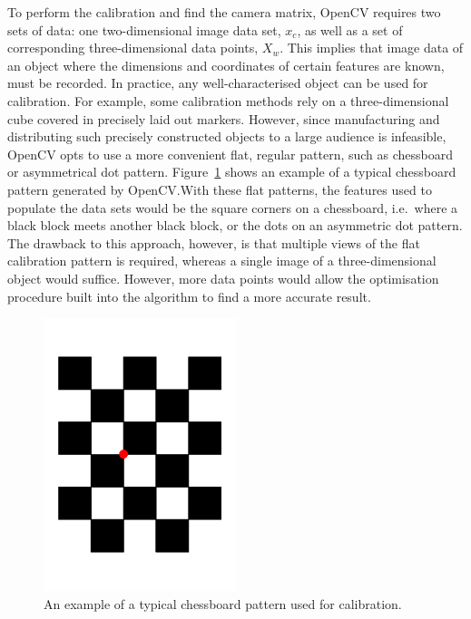 To perform the calibration and find the camera matrix, OpenCV requires two sets of data: one two-dimensional image data set, $x_c$, as well as a set of corresponding three-dimensional data points, $X_w$. This implies that image data of an object where the dimensions and coordinates of certain features are known, must be recorded. In practice, any well-characterised object can be used for calibration. For example, some calibration methods rely on a three-dimensional cube covered in precisely laid out markers. However, since manufacturing and distributing such precisely constructed objects to a large audience is infeasible, OpenCV opts to use a more convenient flat, regular pattern, such as chessboard or asymmetrical dot pattern. Figure~\ref{fig:chap2-calib-pattern} shows an example of a typical chessboard pattern generated by OpenCV.\@ With these flat patterns, the features used to populate the data sets would be the square corners on a chessboard, i.e.\ where a black block meets another black block, or the dots on an asymmetric dot pattern. The drawback to this approach, however, is that multiple views of the flat calibration pattern is required, whereas a single image of a three-dimensional object would suffice. However, more data points would allow the optimisation procedure built into the algorithm to find a more accurate result.  

\begin{figure}
  \centering
  \includegraphics[angle=90, width=0.5\textwidth]{figures/chapter2/chessboard_pattern}
  \caption{An example of a typical chessboard pattern used for calibration.}
\label{fig:chap2-calib-pattern}
\end{figure}

